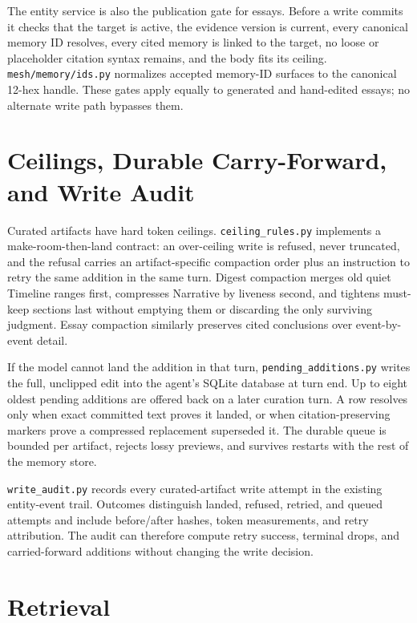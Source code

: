\documentclass[11pt,letterpaper]{report}
\newcommand{\code}[1]{\texttt{#1}}
\begin{document}
The entity service is also the publication gate for essays. Before a write
commits it checks that the target is active, the evidence version is current,
every canonical memory ID resolves, every cited memory is linked to the
target, no loose or placeholder citation syntax remains, and the body fits
its ceiling. \code{mesh/memory/ids.py} normalizes accepted memory-ID surfaces
to the canonical 12-hex handle. These gates apply equally to generated and
hand-edited essays; no alternate write path bypasses them.

\section{Ceilings, Durable Carry-Forward, and Write Audit}

Curated artifacts have hard token ceilings. \code{ceiling\_rules.py}
implements a make-room-then-land contract: an over-ceiling write is refused,
never truncated, and the refusal carries an artifact-specific compaction
order plus an instruction to retry the same addition in the same turn. Digest
compaction merges old quiet Timeline ranges first, compresses Narrative by
liveness second, and tightens must-keep sections last without emptying them or
discarding the only surviving judgment. Essay compaction similarly preserves
cited conclusions over event-by-event detail.

If the model cannot land the addition in that turn,
\code{pending\_additions.py} writes the full, unclipped edit into the agent's
SQLite database at turn end. Up to eight oldest pending additions are offered
back on a later curation turn. A row resolves only when exact committed text
proves it landed, or when citation-preserving markers prove a compressed
replacement superseded it. The durable queue is bounded per artifact, rejects
lossy previews, and survives restarts with the rest of the memory store.

\code{write\_audit.py} records every curated-artifact write attempt in the
existing entity-event trail. Outcomes distinguish landed, refused, retried,
and queued attempts and include before/after hashes, token measurements, and
retry attribution. The audit can therefore compute retry success, terminal
drops, and carried-forward additions without changing the write decision.

\section{Retrieval}
\end{document}
